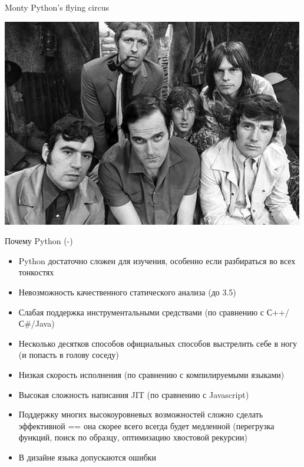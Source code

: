 \documentclass{article}
\begin{document}
\begin{center} \Large{Monty Python's flying circus} \end{center}
\begin{center} \includegraphics{images/montypython.jpg} \end{center}
\newpage

\begin{center} Почему Python (-) \end{center}
\begin{itemize}
    \item Python достаточно сложен для изучения, особенно если разбираться во всех тонкостях
    \item Невозможность качественного статического анализа (до 3.5)
    \item Слабая поддержка инструментальными средствами (по сравнению с С++/С\#/Java)
    \item Несколько десятков способов официальных способов выстрелить себе в ногу (и попасть в голову соседу)
    \item Низкая скорость исполнения (по сравнению с компилируемыми языками)
    \item Высокая сложность написания JIT (по сравнению с Javascript)
    \item Поддержку многих высокоуровневых возможностей сложно сделать эффективной 
          == она скорее всего всегда будет медленной
            (перегрузка функций, поиск по образцу, оптимизацию хвостовой рекурсии)
    \item В дизайне языка допускаются ошибки
\end{itemize}
\newpage
\end{document}
